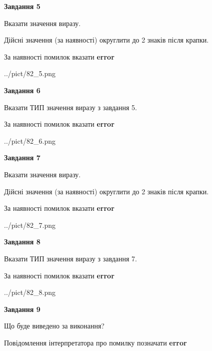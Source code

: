 \documentclass[11pt, ukrainian]{article}
\begin{document}
{\begin {large}
{\begin {center}\textbf{Завдання 5}\end {center}}\par
Вказати значення виразу. \par
Дійсні значення (за наявності) округлити до 2 знаків після крапки. \par
За наявності помилок вказати \textbf{error}

\begin{center}
	{../pict/82_5.png}
\end{center}
\newpage

{\begin {center}\textbf{Завдання 6}\end {center}}\par
Вказати ТИП значення виразу з завдання 5. \par
За наявності помилок вказати \textbf{error}

\begin{center}
	{../pict/82_6.png}
\end{center}
\newpage

{\begin {center}\textbf{Завдання 7}\end {center}}\par
Вказати значення виразу. \par
Дійсні значення (за наявності) округлити до 2 знаків після крапки. \par
За наявності помилок вказати \textbf{error}

\begin{center}
	{../pict/82_7.png}
\end{center}
\newpage

{\begin {center}\textbf{Завдання 8}\end {center}}\par
Вказати ТИП значення виразу з завдання 7. \par
За наявності помилок вказати \textbf{error}

\begin{center}
	{../pict/82_8.png}
\end{center}
\newpage

{\begin {center}\textbf{Завдання 9}\end {center}}\par
Що буде виведено за виконання? \par
Повідомлення інтерпретатора про помилку позначати \textbf{error}


\end{large}}
\end{document}
